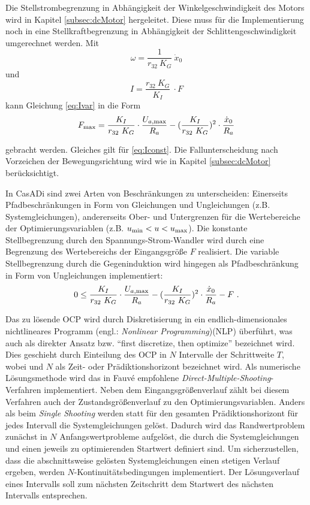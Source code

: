 Die Stellstrombegrenzung in Abhängigkeit der Winkelgeschwindigkeit des Motors wird in Kapitel \ref{subsec:dcMotor} hergeleitet. Diese muss für die Implementierung noch in eine Stellkraftbegrenzung in Abhängigkeit der Schlittengeschwindigkeit umgerechnet werden.
Mit 
	\[
	\omega = \frac{1}{r_{32}\ K_G} \ \dot{x}_0 
\]
und 
	\[
	I = \frac{r_{32}\ K_G}{K_I} \ \cdot F
\]
kann Gleichung \eqref{eq:Ivar} in die Form
	\[
	F_{\mathrm{max}} = \frac{K_I}{r_{32}\ K_G} \cdot \frac{U_{a\mathrm{,max}}}{R_a} - (\frac{K_I}{r_{32}\ K_G})^2 \cdot \frac{\dot{x}_0}{R_a}
\]

gebracht werden. Gleiches gilt für \eqref{eq:Iconst}. Die Fallunterscheidung nach Vorzeichen der Bewegungsrichtung wird wie in Kapitel \ref{subsec:dcMotor} berücksichtigt. 

In CasADi sind zwei Arten von Beschränkungen zu unterscheiden: Einerseits Pfadbeschränkungen in Form von Gleichungen und Ungleichungen (z.B. Systemgleichungen), andererseits Ober- und Untergrenzen für die Wertebereiche der Optimierungsvariablen (z.B. $u_{\mathrm{min}}<u<u_{\mathrm{max}}$). Die konstante Stellbegrenzung durch den Spannungs-Strom-Wandler wird durch eine Begrenzung des Wertebereichs der Eingangsgröße $F$ realisiert. Die variable Stellbegrenzung durch die Gegeninduktion wird hingegen als Pfadbeschränkung in Form von Ungleichungen implementiert:
\[
	 0 \leq \frac{K_I}{r_{32}\ K_G} \cdot \frac{U_{a\mathrm{,max}}}{R_a} - (\frac{K_I}{r_{32}\ K_G})^2 \cdot \frac{\dot{x}_0}{R_a} - F \ .
\]

Das zu lösende OCP wird durch Diskretisierung in ein endlich-dimensionales nichtlineares Programm (engl.: \textit{Nonlinear Programming})(NLP) überführt, was auch als direkter Ansatz bzw. "`first discretize, then optimize"' bezeichnet wird. Dies geschieht durch Einteilung des OCP in $N$ Intervalle der Schrittweite $T$, wobei und $N$ als Zeit- oder Prädiktionshorizont bezeichnet wird. Als numerische Lösungsmethode wird das in Fauvé \cite{fauve} empfohlene \textit{Direct-Multiple-Shooting}-Verfahren implementiert. Neben dem Eingangsgrößenverlauf zählt bei diesem Verfahren auch der Zustandsgrößenverlauf zu den Optimierungsvariablen. Anders als beim \textit{Single Shooting} werden statt für den gesamten Prädiktionshorizont für jedes Intervall die Systemgleichungen gelöst. Dadurch wird das Randwertproblem zunächst in $N$ Anfangswertprobleme aufgelöst, die durch die Systemgleichungen und einen jeweils zu optimierenden Startwert definiert sind. Um sicherzustellen, dass die abschnittsweise gelösten Systemgleichungen einen stetigen Verlauf ergeben, werden $N$-Kontinuitätsbedingungen implementiert. Der Lösungsverlauf eines Intervalls soll zum nächsten Zeitschritt dem Startwert des nächsten Intervalls entsprechen.

